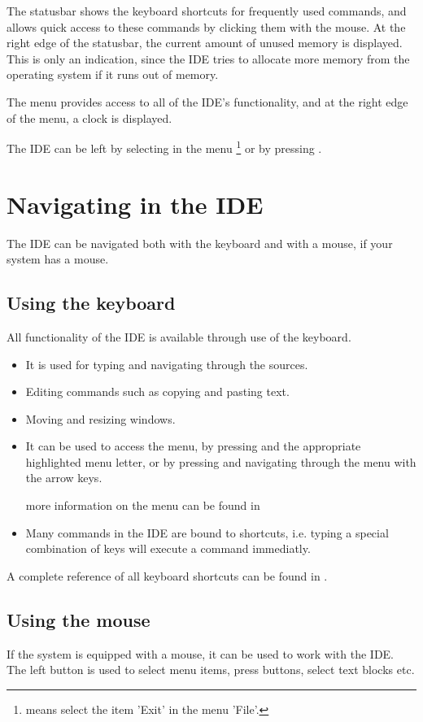The statusbar shows the keyboard shortcuts for frequently used 
commands, and allows quick access to these commands by clicking 
them with the mouse. 
At the right edge of the statusbar, the current amount of unused 
memory is displayed. This is only an indication, since the IDE 
tries to allocate more memory from the operating system if it 
runs out of memory.

The menu provides access to all of the IDE's functionality, and
at the right edge of the menu, a clock is displayed.

The IDE can be left by selecting  in the menu
\footnote{ means select the item 'Exit' in the menu 'File'.}
or by pressing .

\section{Navigating in the IDE}
The IDE can be navigated both with the keyboard and with a mouse, if your
system has a mouse.

\subsection{Using the keyboard} 
All functionality of the IDE is available through use of the keyboard.
\begin{itemize}
\item It is used for typing and navigating through the sources.
\item Editing commands such as copying and pasting text.
\item Moving and resizing windows.
\item It can be used to access the menu, by pressing  and the
appropriate highlighted menu letter, or by pressing  and
navigating through the menu with the arrow keys.

more information on the menu can be found in 
\item Many commands in the IDE are bound to shortcuts, i.e. typing a special
combination of keys will execute a command immediatly.
\end{itemize}
\begin{remark}
A complete reference of all keyboard shortcuts can be found in
.
\end{remark}

\subsection{Using the mouse}
\label{suse:mouseusage}
If the system is equipped with a mouse, it can be used to work with the
IDE. The left button is used to select menu items, press buttons, select
text blocks etc. 

